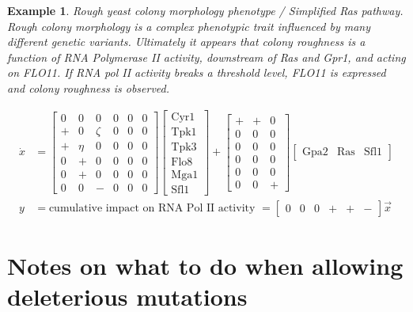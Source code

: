 \documentclass[11 pt]{article}
\newtheorem{example}{Example}
\begin{document}
  \begin{example}
    Rough yeast colony morphology phenotype / Simplified Ras pathway. Rough colony morphology is a complex phenotypic trait influenced by many different genetic variants. Ultimately it appears that colony roughness is a function of RNA Polymerase II activity, downstream of Ras and Gpr1, and acting on FLO11. If RNA pol II activity breaks a threshold level, FLO11 is expressed and colony roughness is observed. 

    \begin{align*}
      \dot{x} &= \begin{bmatrix} 0 & 0 & 0 & 0 & 0 & 0 \\ + & 0 & \zeta & 0 & 0 & 0 \\ + & \eta & 0 & 0 & 0 & 0 \\ 0 & + & 0 & 0 & 0 & 0 \\ 0 & + & 0 & 0 & 0 & 0 \\ 0 & 0 & - & 0 & 0 & 0 \end{bmatrix} \begin{bmatrix} \text{Cyr1} \\ \text{Tpk1} \\ \text{Tpk3} \\ \text{Flo8} \\ \text{Mga1} \\ \text{Sfl1} \end{bmatrix} + \begin{bmatrix} + & +  & 0 \\ 0 & 0 & 0 \\ 0 & 0 & 0 \\ 0 & 0 & 0 \\ 0 & 0 & 0 \\ 0 & 0 & + \end{bmatrix} \begin{bmatrix} \text{Gpa2} & \text{Ras} & \text{Sfl1} \end{bmatrix} \\
        y &= \text{cumulative impact on RNA Pol II activity } = \begin{bmatrix} 0 & 0 & 0 & + & + & - \end{bmatrix} \vec{x}
    \end{align*}
  \end{example}
\section{Notes on what to do when allowing deleterious mutations} 
\end{document}
